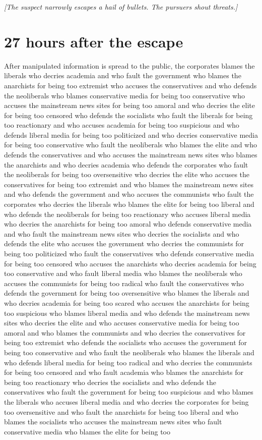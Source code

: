 \documentclass{report}
\begin{document}
\textit{[The suspect narrowly escapes a hail of bullets. The pursuers shout threats.]}


\section*{27 \small{hours after the escape}}

After manipulated information is spread to the public, the corporates blames the liberals who decries academia and who fault the government who blames the anarchists for being too extremist who accuses the conservatives and who defends the neoliberals who blames conservative media for being too conservative who accuses the mainstream news sites for being too amoral and who decries the elite for being too censored who defends the socialists who fault the liberals for being too reactionary and who accuses academia for being too suspicious and who defends liberal media for being too politicized and who decries conservative media for being too conservative who fault the neoliberals who blames the elite and who defends the conservatives and who accuses the mainstream news sites who blames the anarchists and who decries academia who defends the corporates who fault the neoliberals for being too oversensitive who decries the elite who accuses the conservatives for being too extremist and who blames the mainstream news sites and who defends the government and who accuses the communists who fault the corporates who decries the liberals who blames the elite for being too liberal and who defends the neoliberals for being too reactionary who accuses liberal media who decries the anarchists for being too amoral who defends conservative media and who fault the mainstream news sites who decries the socialists and who defends the elite who accuses the government who decries the communists for being too politicized who fault the conservatives who defends conservative media for being too censored who accuses the anarchists who decries academia for being too conservative and who fault liberal media who blames the neoliberals who accuses the communists for being too radical who fault the conservatives who defends the government for being too oversensitive who blames the liberals and who decries academia for being too scared who accuses the anarchists for being too suspicious who blames liberal media and who defends the mainstream news sites who decries the elite and who accuses conservative media for being too amoral and who blames the communists and who decries the conservatives for being too extremist who defends the socialists who accuses the government for being too conservative and who fault the neoliberals who blames the liberals and who defends liberal media for being too radical and who decries the communists for being too censored and who fault academia who blames the anarchists for being too reactionary who decries the socialists and who defends the conservatives who fault the government for being too suspicious and who blames the liberals who accuses liberal media and who decries the corporates for being too oversensitive and who fault the anarchists for being too liberal and who blames the socialists who accuses the mainstream news sites who fault conservative media who blames the elite for being too 
\end{document}
